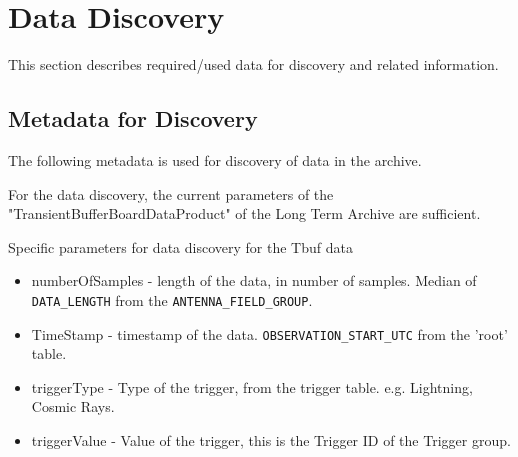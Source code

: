 \documentclass[a4paper,10pt,bibtotoc]{scrartcl}
\begin{document}
\clearpage


\section{Data Discovery}
This section describes required/used data for discovery and related information.





\subsection{Metadata for Discovery}
The following metadata is used for discovery of data in the archive. %

For the data discovery, the current parameters of the "TransientBufferBoardDataProduct" of the Long Term Archive are sufficient. 

Specific parameters for data discovery for the Tbuf data
\begin{itemize}
    \item numberOfSamples - length of the data, in number of samples. Median of \texttt{DATA\_LENGTH} from the \verb|ANTENNA_FIELD_GROUP|.
    \item TimeStamp - timestamp of the data. \verb|OBSERVATION_START_UTC| from the 'root' table.
    \item triggerType - Type of the trigger, from the trigger table. e.g. Lightning, Cosmic Rays.
    \item triggerValue - Value of the trigger, this is the Trigger ID of the Trigger group.
\end{itemize}
\end{document}
